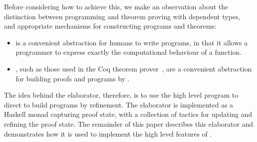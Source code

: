Before considering how to achieve this, we make an observation about the distinction between
programming and theorem proving with dependent types, and appropriate mechanisms for
constructing programs and theorems:

\begin{itemize}
\item {} is a convenient abstraction for humans to write
programs, in that it allows a programmer to express exactly the computational
behaviour of a function.
\item {}, such as those used in the Coq theorem
prover~\cite{Bertot2004}, are a convenient abstraction for building proofs and
programs by .
\end{itemize}

The idea behind the \Idris{} elaborator, therefore, is to use the high level
program to direct  to build \TT{} programs by refinement.  The
elaborator is implemented as a Haskell monad capturing proof state, with a
collection of tactics for updating and refining the proof state.  The remainder
of this paper describes this elaborator and demonstrates how it is used to
implement the high level features of \Idris{}.



